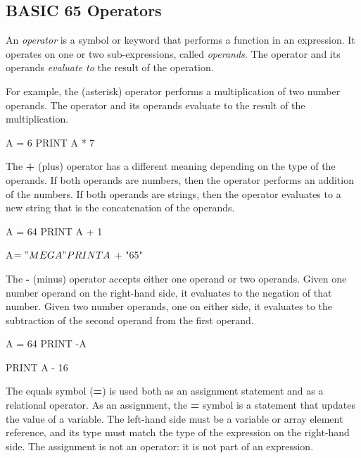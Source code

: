 \subsection{BASIC 65 Operators}

An {\em operator} is a symbol or keyword that performs a function in an expression. It operates on one or two sub-expressions, called {\em operands}. The operator and its operands {\em evaluate to} the result of the operation.

For example, the {\bf *} (asterisk) operator performs a multiplication of two number operands. The operator and its operands evaluate to the result of the multiplication.

\begin{screencode}
A = 6
PRINT A * 7
\end{screencode}

The {\bf +} (plus) operator has a different meaning depending on the type of the operands. If both operands are numbers, then the operator performs an addition of the numbers. If both operands are strings, then the operator evaluates to a new string that is the concatenation of the operands.

\begin{screencode}
A = 64
PRINT A + 1

A$ = "MEGA"
PRINT A$ + "65"
\end{screencode}

The {\bf -} (minus) operator accepts either one operand or two operands. Given one number operand on the right-hand side, it evaluates to the negation of that number. Given two number operands, one on either side, it evaluates to the subtraction of the second operand from the first operand.

\begin{screencode}
A = 64
PRINT -A

PRINT A - 16
\end{screencode}

The equals symbol ({\bf =}) is used both as an assignment statement and as a relational operator. As an assignment, the {\bf =} symbol is a statement that updates the value of a variable. The left-hand side must be a variable or array element reference, and its type must match the type of the expression on the right-hand side. The assignment is not an operator: it is not part of an expression.


